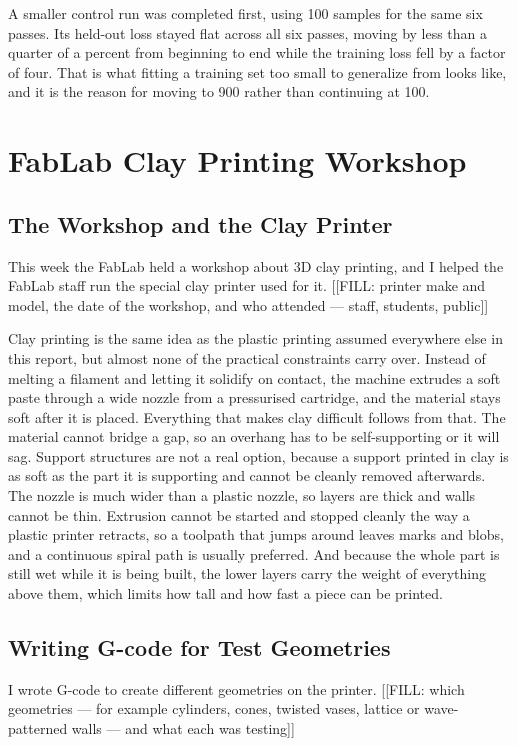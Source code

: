 \documentclass[11pt,a4paper]{article}
\begin{document}
A smaller control run was completed first, using 100 samples for the same six passes. Its held-out loss stayed flat across all six passes, moving by less than a quarter of a percent from beginning to end while the training loss fell by a factor of four. That is what fitting a training set too small to generalize from looks like, and it is the reason for moving to 900 rather than continuing at 100.


\section{FabLab Clay Printing Workshop}
\subsection{The Workshop and the Clay Printer}
This week the FabLab held a workshop about 3D clay printing, and I helped the FabLab staff run the special clay printer used for it. [[FILL: printer make and model, the date of the workshop, and who attended --- staff, students, public]]

Clay printing is the same idea as the plastic printing assumed everywhere else in this report, but almost none of the practical constraints carry over. Instead of melting a filament and letting it solidify on contact, the machine extrudes a soft paste through a wide nozzle from a pressurised cartridge, and the material stays soft after it is placed. Everything that makes clay difficult follows from that. The material cannot bridge a gap, so an overhang has to be self-supporting or it will sag. Support structures are not a real option, because a support printed in clay is as soft as the part it is supporting and cannot be cleanly removed afterwards. The nozzle is much wider than a plastic nozzle, so layers are thick and walls cannot be thin. Extrusion cannot be started and stopped cleanly the way a plastic printer retracts, so a toolpath that jumps around leaves marks and blobs, and a continuous spiral path is usually preferred. And because the whole part is still wet while it is being built, the lower layers carry the weight of everything above them, which limits how tall and how fast a piece can be printed.

\subsection{Writing G-code for Test Geometries}
I wrote G-code to create different geometries on the printer. [[FILL: which geometries --- for example cylinders, cones, twisted vases, lattice or wave-patterned walls --- and what each was testing]]
\end{document}
